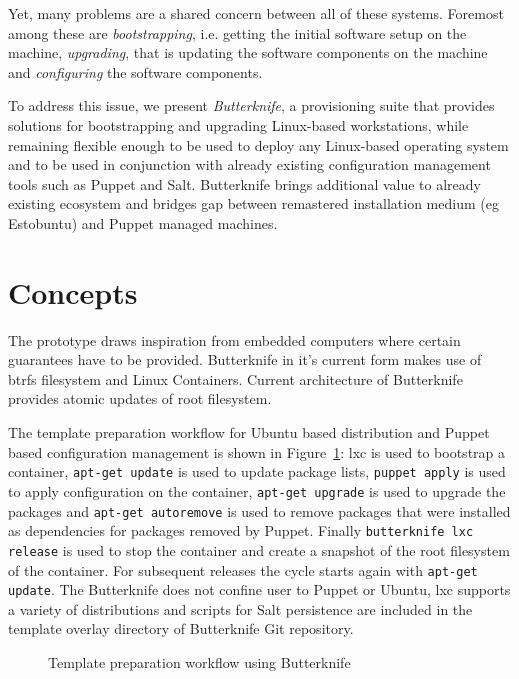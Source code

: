 \documentclass[a4paper,11pt]{kth-mag}
\begin{document}
Yet, many problems are a shared concern between all of these systems.
Foremost among these are \emph{bootstrapping}, i.e. getting
the initial software setup on the machine,
\emph{upgrading}, that is updating the software components on the machine and
\emph{configuring} the software components.

To address this issue, we present \emph{Butterknife},
a provisioning suite that provides solutions for bootstrapping and
upgrading Linux-based workstations, while remaining flexible enough
to be used to deploy any Linux-based operating system
and to be used in conjunction with already existing
configuration management tools such as Puppet and Salt.
Butterknife brings additional value to already existing
ecosystem and bridges gap between remastered installation medium
(eg Estobuntu) and Puppet managed machines.

\section{Concepts}
\label{sec:concepts}

The prototype draws inspiration from embedded computers
where certain guarantees have to be provided.
Butterknife in it's current form makes use of \acrshort{btrfs}
filesystem and Linux Containers.
Current architecture of Butterknife provides
atomic updates of root filesystem.

The template preparation workflow for
Ubuntu based distribution and Puppet based configuration
management is shown in
Figure~\ref{fig:template-preparation-workflow}:
\acrshort{lxc} is used to bootstrap a container,
\lstinline!apt-get update! is used to update package lists,
\lstinline!puppet apply! is used to apply configuration on the container,
\lstinline!apt-get upgrade! is used to upgrade the packages and
\lstinline!apt-get autoremove! is used to remove packages that
were installed as dependencies
for packages removed by Puppet.
Finally \lstinline!butterknife lxc release! is used to stop
the container and create a snapshot of the root filesystem of the container.
For subsequent releases the cycle starts again with \lstinline!apt-get update!.
The Butterknife does not confine user to Puppet or Ubuntu,
\acrshort{lxc} supports a variety of distributions and scripts for
Salt persistence are included in the template overlay
directory of Butterknife Git repository.

\begin{figure}[!htb]
\centering
\scalebox{0.6}{}
\caption{Template preparation workflow using Butterknife}
\label{fig:template-preparation-workflow}
\end{figure}
\end{document}
